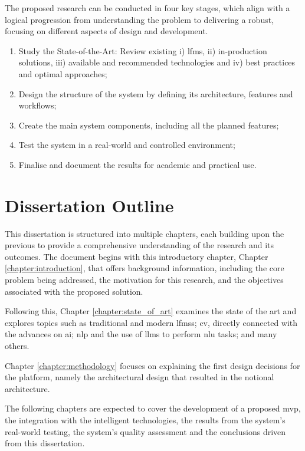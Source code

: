 The proposed research can be conducted in four key stages, which align with a logical progression from understanding the problem to delivering a robust, focusing on different aspects of design and development.

\begin{enumerate}
    \item Study the State-of-the-Art: Review existing i) \acl{lfms}, ii) in-production solutions, iii) available and recommended technologies and iv) best practices and optimal approaches;
    \item Design the structure of the system by defining its architecture, features and workflows;
    \item Create the main system components, including all the planned features;
    \item Test the system in a real-world and controlled environment;
    \item Finalise and document the results for academic and practical use.
\end{enumerate}

\section{Dissertation Outline} \label{section:dissertation_outline}

This dissertation is structured into multiple chapters, each building upon the previous to provide a comprehensive understanding of the research and its outcomes. The document begins with this introductory chapter, Chapter  \ref{chapter:introduction}, that offers background information, including the core problem being addressed, the motivation for this research, and the objectives associated with the proposed solution.

Following this, Chapter \ref{chapter:state_of_art} examines the state of the art and explores topics such as traditional and modern \acp{lfms}; \ac{cv}, directly connected with the advances on \ac{ai}; \ac{nlp} and the use of \acp{llm} to perform \ac{nlu} tasks; and many others.

Chapter \ref{chapter:methodology} focuses on explaining the first design decisions for the platform, namely the architectural design that resulted in the notional architecture.

The following chapters are expected to cover the development of a proposed \ac{mvp}, the integration with the intelligent technologies, the results from the system's real-world testing, the system's quality assessment and the conclusions driven from this dissertation.
